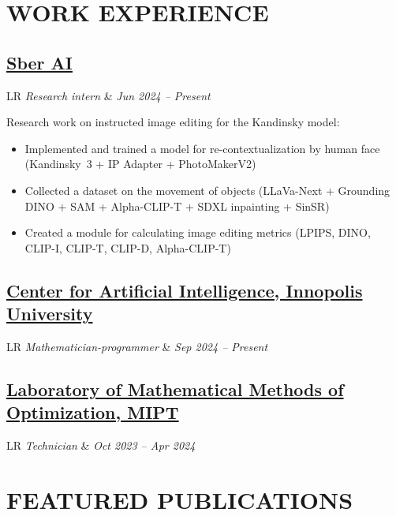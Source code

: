 \documentclass[11pt,a4paper]{moderncv}
\newcommand*{\experienceentry}[4][1.5mm]{
    \subsection{#2} \vspace{-1.5mm}
    \begin{tabularx}{\textwidth}{LR}
        {\itshape #3} & {\itshape #4}
    \end{tabularx}
    \par\addvspace{#1}
}
\begin{document}
\maketitle
\vspace{-1cm}

\begin{minipage}[t]{0.62\textwidth}

\section{WORK EXPERIENCE}
\experienceentry{\href{https://ai.sber.ru/en/about}{Sber AI}}{Research intern}{Jun 2024 -- Present}{
    Research work on instructed image editing for the Kandinsky model:
    \begin{itemize}
        \item Implemented and trained a model for re-contextualization by human face (Kandinsky~3 + IP Adapter + PhotoMakerV2)
        \item Collected a dataset on the movement of objects (LLaVa-Next + Grounding DINO + SAM + Alpha-CLIP-T + SDXL inpainting + SinSR)
        \item Created a module for calculating image editing metrics (LPIPS, DINO, CLIP-I, CLIP-T, CLIP-D, Alpha-CLIP-T)
    \end{itemize}
}
\experienceentry{\href{https://innopolis.university/en/centerforartificialintelligence/}{Center for Artificial Intelligence, Innopolis University}}{Mathematician-programmer}{Sep 2024 -- Present}
\experienceentry{\href{https://labmmo.ru/en}{Laboratory of Mathematical Methods of Optimization, MIPT}}{Technician}{Oct 2023 -- Apr 2024}

\section{FEATURED PUBLICATIONS}


\end{minipage}
\end{document}
